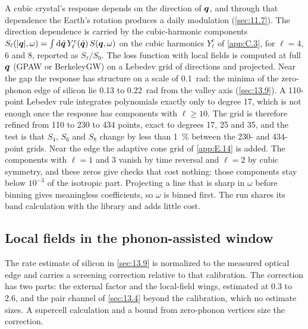A cubic crystal's response depends on the direction of $\bm{q}$, and through that dependence the Earth's rotation produces a daily modulation (\cref{sec:11.7}). The direction dependence is carried by the cubic-harmonic components $S_\ell(|\bm{q}|,\omega) = \int\mathrm{d}\hat{\bm{q}}\,Y^{\mathrm{c}}_\ell(\hat{\bm{q}})\,S(\bm{q},\omega)$ on the cubic harmonics $Y^{\mathrm{c}}_\ell$ of \cref{app:C.3}, for $\ell = 4$, 6 and 8, reported as $S_\ell/S_0$. The loss function with local fields is computed at full $\bm{q}$ (GPAW or BerkeleyGW) on a Lebedev grid of directions and projected. Near the gap the response has structure on a scale of \SI{0.1}{rad}: the minima of the zero-phonon edge of silicon lie 0.13 to \SI{0.22}{rad} from the valley axis (\cref{sec:13.9}). A 110-point Lebedev rule integrates polynomials exactly only to degree 17, which is not enough once the response has components with $\ell \ge 10$. The grid is therefore refined from 110 to 230 to 434 points, exact to degrees 17, 25 and 35, and the test is that $S_4$, $S_6$ and $S_8$ change by less than \SI{1}{\percent} between the 230- and 434-point grids. Near the edge the adaptive cone grid of \cref{app:E.14} is added. The components with $\ell = 1$ and 3 vanish by time reversal and $\ell = 2$ by cubic symmetry, and these zeros give checks that cost nothing: those components stay below $10^{-3}$ of the isotropic part. Projecting a line that is sharp in $\omega$ before binning gives meaningless coefficients, so $\omega$ is binned first. The run shares its band calculation with the library and adds little cost.

\subsection{Local fields in the phonon-assisted window}

The rate estimate of silicon in \cref{sec:13.9} is normalized to the measured optical edge and carries a screening correction relative to that calibration. The correction has two parts: the external factor and the local-field wings, estimated at 0.3 to 2.6, and the pair channel of \cref{sec:13.4} beyond the calibration, which no estimate sizes. A supercell calculation and a bound from zero-phonon vertices size the correction.

